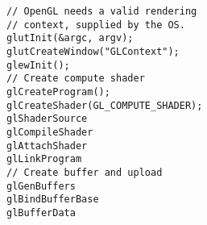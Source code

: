 \lstset{language=C++}
\begin{lstlisting}
// OpenGL needs a valid rendering
// context, supplied by the OS.
glutInit(&argc, argv);
glutCreateWindow("GLContext");
glewInit();
// Create compute shader
glCreateProgram();
glCreateShader(GL_COMPUTE_SHADER);
glShaderSource
glCompileShader
glAttachShader
glLinkProgram
// Create buffer and upload
glGenBuffers
glBindBufferBase
glBufferData
\end{lstlisting}